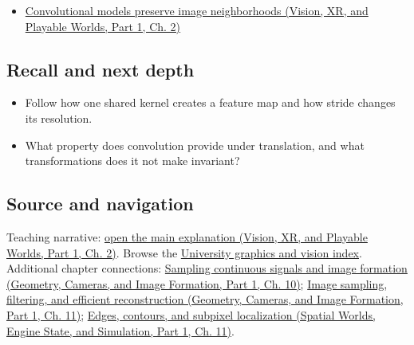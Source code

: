 \hypertarget{appendix-47c51ea026fb-full-teaching-explanation}{}

\begin{itemize}
\tightlist
\item
  \href{../07-Vision-XR-and-Playable-Worlds-P01/main.pdf\#04-visual-computing-ii-ch031-convolutional-models-preserve-image-neighborhoods}{Convolutional models preserve image neighborhoods (Vision, XR, and Playable Worlds, Part 1, Ch. 2)}
\end{itemize}

\subsection{Recall and next depth}\label{appendix-47c51ea026fb-recall-and-next-depth}

\hypertarget{appendix-47c51ea026fb-recall-and-next-depth}{}

\begin{itemize}
\tightlist
\item
  Follow how one shared kernel creates a feature map and how stride changes its resolution.
\item
  What property does convolution provide under translation, and what transformations does it not make invariant?
\end{itemize}

\subsection{Source and navigation}\label{appendix-47c51ea026fb-source-and-navigation}

\hypertarget{appendix-47c51ea026fb-source-and-navigation}{}

Teaching narrative: \href{../07-Vision-XR-and-Playable-Worlds-P01/main.pdf\#04-visual-computing-ii-ch031-convolutional-models-preserve-image-neighborhoods}{open the main explanation (Vision, XR, and Playable Worlds, Part 1, Ch. 2)}. Browse the \hyperref[appendix-a6d556a4ef50-university-graphics-vision-and-photography---independent-series]{University graphics and vision index}. Additional chapter connections: \href{../03-Geometry-Cameras-and-Image-Formation-P01/main.pdf\#03-visual-computing-i-ch003-sampling-continuous-signals-and-image-formation}{Sampling continuous signals and image formation (Geometry, Cameras, and Image Formation, Part 1, Ch. 10)}; \href{../03-Geometry-Cameras-and-Image-Formation-P01/main.pdf\#03-visual-computing-i-ch004-image-sampling-filtering-and-efficient-reconstruction}{Image sampling, filtering, and efficient reconstruction (Geometry, Cameras, and Image Formation, Part 1, Ch. 11)}; \href{../05-Spatial-Worlds-Engine-State-and-Simulation-P01/main.pdf\#04-visual-computing-ii-ch030-edges-contours-and-subpixel-localization}{Edges, contours, and subpixel localization (Spatial Worlds, Engine State, and Simulation, Part 1, Ch. 11)}.


